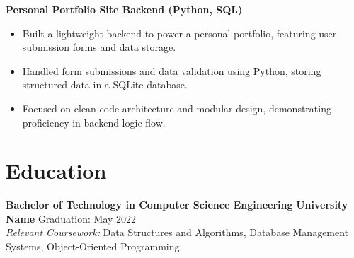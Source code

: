 \documentclass[10pt, letterpaper]{article}
\begin{document}
\textbf{Personal Portfolio Site Backend (Python, SQL)}
\begin{itemize}[leftmargin=*, itemsep=1pt]
    \item Built a lightweight backend to power a personal portfolio, featuring user submission forms and data storage.
    \item Handled form submissions and data validation using Python, storing structured data in a SQLite database.
    \item Focused on clean code architecture and modular design, demonstrating proficiency in backend logic flow.
\end{itemize}

\section*{Education}
\textbf{Bachelor of Technology in Computer Science Engineering}
\hfill \textbf{University Name} \hfill Graduation: May 2022 \\
\textit{Relevant Coursework:} Data Structures and Algorithms, Database Management Systems, Object-Oriented Programming.
\end{document}
